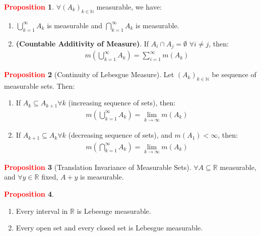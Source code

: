 \documentclass[reqno,11pt]{amsart}
\theoremstyle{definition}
\newcommand{\bb}[1]{\mathbb{#1}}
\theoremstyle{definition}
\newtheorem{prop}{\textcolor{red}{Proposition}}
\theoremstyle{remark}
\begin{document}
\begin{prop}
	$\forall (A_k)_{k \in \bb{N}}$ measurable, we have: 
	\begin{enumerate}[nolistsep]
		\item $\bigcup_{k=1}^\infty A_k$ is measurable and $\bigcap_{k=1}^\infty A_k$ is measurable. 
		\item \textbf{(Countable Additivity of Measure)}. If $A_i \cap A_j = \emptyset$ $\forall i \neq j$, then: 
		\begin{align}
			m \left( 	\bigcup_{k=1}^\infty A_k 	\right) = \sum_{i=1}^\infty m(A_k) 
		\end{align}
	\end{enumerate}	
\end{prop}

\begin{prop}[Continuity of Lebesgue Measure]
	Let $(A_k)_{k \in \bb{N}}$ be sequence of measurable sets. Then: 
	\begin{enumerate}
		\item If $A_k \subseteq A_{k+1} \forall k$ (increasing sequence of sets), then: 
		\begin{align}
			m \left( 	\bigcup_{k=1}^\infty A_k 	\right) = \lim_{k \rightarrow \infty} m(A_k) 
		\end{align}
		\item If $A_{k+1} \subseteq A_k \forall k$ (decreasing sequence of sets), and $m(A_{1}) <\infty$,  then: 
		\begin{align}
						m \left( 	\bigcap_{k=1}^\infty A_k 	\right) = \lim_{k \rightarrow \infty} m(A_k) 
		\end{align}
	\end{enumerate}
\end{prop}

\begin{prop}[Translation Invariance of Measurable Sets]
	$\forall A \subseteq \bb{R}$ measurable, and $\forall y \in \bb{R}$ fixed, $A+y$ is measurable. 
\end{prop}

\begin{prop}
	\begin{enumerate}[nolistsep]
		\item Every interval in $\bb{R}$ is Lebesuge measurable. 
		\item Every open set and every closed set is Lebesgue measurable. 
	\end{enumerate}
\end{prop}
\end{document}
